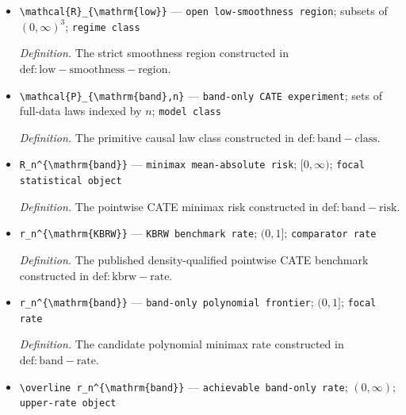 \documentclass{article}
\begin{document}
\begin{itemize}
  \par\smallskip\noindent\emph{Definition.} The radius-\(L\) isotropic H\"older ball of order \(u\), constructed in \(\mathrm{def:holder-ball}\).
  \item \texttt{\textbackslash{}\allowbreak{}mathcal\{R\}\allowbreak{}\_\allowbreak{}\{\textbackslash{}\allowbreak{}mathrm\{low\}\allowbreak{}\}\allowbreak{}} --- \texttt{open low-\allowbreak{}smoothness region}; subsets of \((0,\infty)^3\); \texttt{regime class}
  \par\smallskip\noindent\emph{Definition.} The strict smoothness region constructed in \(\mathrm{def:low-smoothness-region}\).
  \item \texttt{\textbackslash{}\allowbreak{}mathcal\{P\}\allowbreak{}\_\allowbreak{}\{\textbackslash{}\allowbreak{}mathrm\{band\}\allowbreak{},\allowbreak{}n\}\allowbreak{}} --- \texttt{band-\allowbreak{}only CATE experiment}; sets of full-data laws indexed by \(n\); \texttt{model class}
  \par\smallskip\noindent\emph{Definition.} The primitive causal law class constructed in \(\mathrm{def:band-class}\).
  \item \texttt{R\_\allowbreak{}n\textasciicircum{}\{\textbackslash{}\allowbreak{}mathrm\{band\}\allowbreak{}\}\allowbreak{}} --- \texttt{minimax mean-\allowbreak{}absolute risk}; \([0,\infty)\); \texttt{focal statistical object}
  \par\smallskip\noindent\emph{Definition.} The pointwise CATE minimax risk constructed in \(\mathrm{def:band-risk}\).
  \item \texttt{r\_\allowbreak{}n\textasciicircum{}\{\textbackslash{}\allowbreak{}mathrm\{KBRW\}\allowbreak{}\}\allowbreak{}} --- \texttt{KBRW benchmark rate}; \((0,1]\); \texttt{comparator rate}
  \par\smallskip\noindent\emph{Definition.} The published density-qualified pointwise CATE benchmark constructed in \(\mathrm{def:kbrw-rate}\).
  \item \texttt{r\_\allowbreak{}n\textasciicircum{}\{\textbackslash{}\allowbreak{}mathrm\{band\}\allowbreak{}\}\allowbreak{}} --- \texttt{band-\allowbreak{}only polynomial frontier}; \((0,1]\); \texttt{focal rate}
  \par\smallskip\noindent\emph{Definition.} The candidate polynomial minimax rate constructed in \(\mathrm{def:band-rate}\).
  \item \texttt{\textbackslash{}\allowbreak{}overline r\_\allowbreak{}n\textasciicircum{}\{\textbackslash{}\allowbreak{}mathrm\{band\}\allowbreak{}\}\allowbreak{}} --- \texttt{achievable band-\allowbreak{}only rate}; \((0,\infty)\); \texttt{upper-\allowbreak{}rate object}

\end{itemize}
\end{document}
